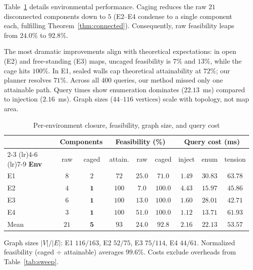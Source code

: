 \documentclass[conference]{IEEEtran}
\begin{document}
Table~\ref{tab:perenv} details environmental performance. Caging reduces the raw $21$ disconnected components down to $5$ (E2--E4 condense to a single component each, fulfilling Theorem~\ref{thm:connected}). Consequently, raw feasibility leaps from $24.0\%$ to $92.8\%$.

The most dramatic improvements align with theoretical expectations: in open (E2) and free-standing (E3) maps, uncaged feasibility is $7\%$ and $13\%$, while the cage hits $100\%$. In E1, sealed walls cap theoretical attainability at $72\%$; our planner resolves $71\%$. Across all $400$ queries, our method missed only one attainable path. Query times show enumeration dominates ($22.13$~ms) compared to injection ($2.16$~ms). Graph sizes ($44$--$116$ vertices) scale with topology, not map area.

\begin{table}[htbp]
\caption{Per-environment closure, feasibility, graph size, and query cost}
\label{tab:perenv}
\begin{center}
\setlength{\tabcolsep}{3.5pt}
\begin{tabular}{@{}lcccccccc@{}}
\toprule
& \multicolumn{2}{c}{\textbf{Components}} & \multicolumn{3}{c}{\textbf{Feasibility (\%)}} & \multicolumn{3}{c}{\textbf{Query cost (ms)}} \\
\cmidrule(lr){2-3} \cmidrule(lr){4-6} \cmidrule(lr){7-9}
\textbf{Env} & raw & caged & attain. & raw & caged & inject & enum & tension \\ \midrule
E1 & $8$ & $2$ & $72$ & $25.0$ & $71.0$ & $1.49$ & $30.83$ & $63.78$ \\
E2 & $4$ & $\mathbf{1}$ & $100$ & $7.0$ & $\mathbf{100.0}$ & $4.43$ & $15.97$ & $45.86$ \\
E3 & $6$ & $\mathbf{1}$ & $100$ & $13.0$ & $\mathbf{100.0}$ & $1.60$ & $28.01$ & $42.71$ \\
E4 & $3$ & $\mathbf{1}$ & $100$ & $51.0$ & $\mathbf{100.0}$ & $1.12$ & $13.71$ & $61.93$ \\ \midrule
Mean & $21$ & $\mathbf{5}$ & $93$ & $24.0$ & $\mathbf{92.8}$ & $2.16$ & $22.13$ & $53.57$ \\ \bottomrule
\end{tabular}
\end{center}
\footnotesize Graph sizes $|V|/|E|$: E1 $116/163$, E2 $52/75$, E3 $75/114$, E4 $44/61$. Normalized feasibility (caged $\div$ attainable) averages $99.6\%$. Costs exclude overheads from Table~\ref{tab:sweep}.
\end{table}
\end{document}
